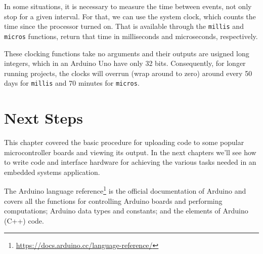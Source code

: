 In some situations, it is necessary to measure the time between events, not only stop for a given interval.
For that, we can use the system clock, which counts the time since the processor turned on.
That is available through the \texttt{millis} and \texttt{micros} functions, return that time in milliseconds and microseconds, respectively.

These clocking functions take no arguments and their outputs are usigned long integers, which in an Arduino Uno have only 32 bits.
Consequently, for longer running projects, the clocks will overrun (wrap around to zero) around every 50 days for \texttt{millis} and 70 minutes for \texttt{micros}.


\section{Next Steps}

This chapter covered the basic procedure for uploading code to some popular microcontroller boards and viewing its output.
In the next chapters we'll see how to write code and interface hardware for achieving the various tasks needed in an embedded systems application.

The Arduino language reference\footnote{\url{https://docs.arduino.cc/language-reference/}} is the official documentation of Arduino and covers all the functions for controlling Arduino boards and performing computations; Arduino data types and constants; and the elements of Arduino (C++) code.

